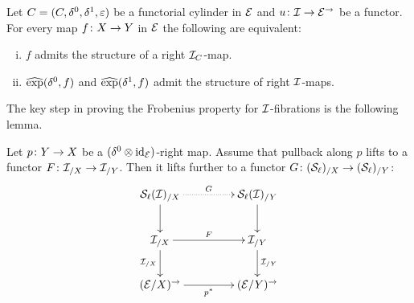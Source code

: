 \documentclass[reqno,10pt,a4paper,oneside]{amsart}
\begin{document}
\begin{proposition} \label{prod-exp-general}
Let $\cyl = (\cyl, \lcyl, \rcyl, \ccyl)$ be a functorial cylinder in $\catE$ and
 $u \co \cal{I} \to \catE^\to$ be a functor. For every map $f \co X \to Y$ in $\cal{E}$ 
 the following are equivalent: 
\begin{enumerate}[(i)]
\item $f$ admits the structure of a right $\cal{I}_\cyl$-map. 
\item $\hatexp(\lcyl, f)$ and $\hatexp(\rcyl, f)$ admit the structure of right $\cal{I}$-maps.
\end{enumerate} 
\end{proposition}



\medskip

The key step in proving the Frobenius property
for $\cal{I}$-fibrations is the following lemma.

\begin{lemma}
\label{strong-h-equiv-base-change-along-fibration}
Let $p \co Y \to X$ be a $(\lcyl \otimes \id_{\calE})$-right map.
Assume that pullback  along $p$ lifts to a functor $F \co \cal{I}_{/X} \to \cal{I}_{/Y}$.
Then it lifts further to a functor $G \co (\cal{S}_\ell)_{/X} \to (\cal{S}_\ell)_{/Y}$:
\[
\xymatrix@C+2em{
  \cal{S}_\ell(\cal{I})_{/X}
  \ar@{.>}[r]^{G}
  \ar[d]
&
  \cal{S}_\ell(\cal{I})_{/Y}
  \ar[d]
\\
  \cal{I}_{/X}
  \ar[r]^{F}
  \ar[d]_{\cal{I}_{/X}}
&
  \cal{I}_{/Y}
  \ar[d]^{\cal{I}_{/Y}}
\\
  (\catE / X)^{\to}
  \ar[r]_{p^*}
&
  (\catE / Y)^{\to}
}
\]
\end{lemma}
\end{document}

